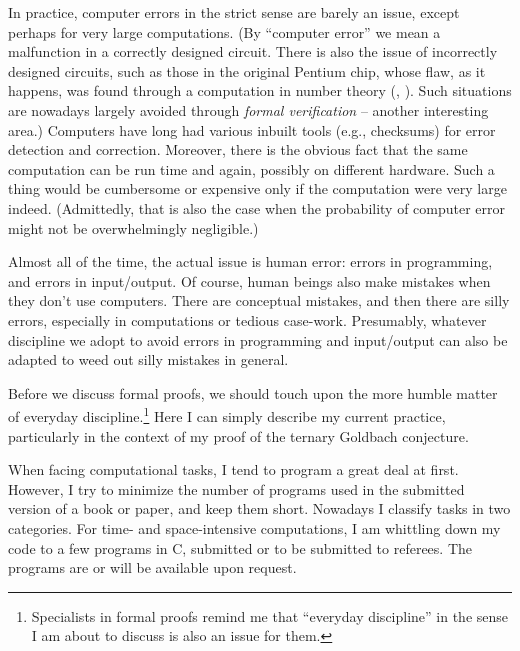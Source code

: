 In practice, computer errors in the strict sense
are barely an issue, except perhaps for very large computations. (By
``computer error'' we mean a malfunction in a correctly designed circuit.
There is also the issue of incorrectly designed circuits, such as those in the
original Pentium chip, whose flaw, as it happens, was found through a
computation in number theory (\cite{Pentium}, \cite{cipra1995number}).
Such situations are nowadays largely avoided
through {\em formal verification} -- another interesting area.)
Computers have long had various inbuilt tools (e.g., checksums) for error
detection and correction. Moreover, there is the obvious fact that the same
computation can be run time and again, possibly on different hardware.
Such a thing would be cumbersome or expensive
only if the computation were very large indeed.
(Admittedly, that is also the case when the probability of computer
error might not be overwhelmingly negligible.)

Almost all of the time, the actual issue is human error: errors in programming,
and errors in input/output. Of course, human beings
also make mistakes when they don't use computers. There are conceptual
mistakes, and then there are silly errors,
especially in computations or tedious case-work. Presumably, whatever discipline
we adopt to avoid errors in programming and input/output can also be adapted
to weed out silly mistakes in general.

Before we discuss formal proofs, we should touch upon the more humble matter
of everyday discipline.\footnote{Specialists in formal proofs remind me that
  ``everyday discipline'' in the sense I am about to discuss is also an issue
  for them.}
Here I can simply describe my current practice,
particularly in the context of my proof of the ternary Goldbach
conjecture. 

When facing computational tasks, I tend to program a great deal at first.
However, I
try to minimize the number of programs used in the submitted version of
a book or paper, and keep them short. Nowadays I classify tasks in two
categories. For time- and
space-intensive computations, I am whittling down my code to a few programs
in C, submitted or to be submitted to referees. The programs are or will be
available upon request. 

